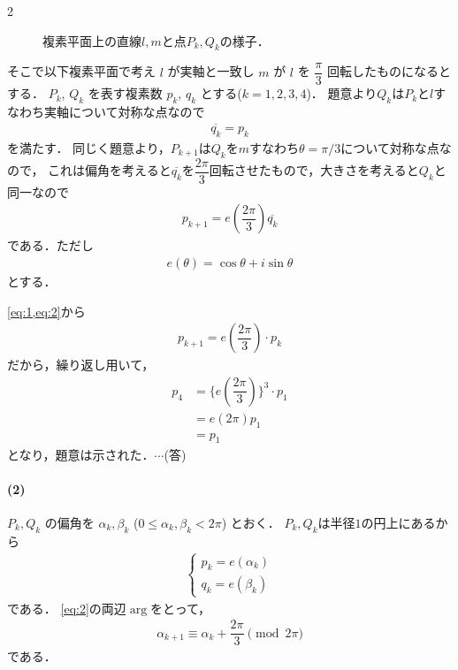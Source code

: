 \documentclass[../../main.tex]{subfiles}
\begin{document}
\begin{multicols}{2}
\begin{figure}[H]
    \caption{複素平面上の直線$l,m$と点$P_k,Q_k$の様子．}
    \label{1996-3:fig:1}
  \end{figure}

  そこで以下複素平面で考え $l$ が実軸と一致し $m$ が $l$ を $\dfrac{\pi}{3}$ 回転したものになるとする．
  $P_k$, $Q_k$ を表す複素数 $p_k$, $q_k$ とする($k=1,2,3,4$)．
  題意より$Q_k$は$P_k$と$l$すなわち実軸について対称な点なので
  \begin{align}
    \overline{q_k} = p_k \label{eq:1}
  \end{align}
  を満たす．
  同じく題意より，$P_{k+1}$は$Q_k$を$m$すなわち$\theta=\pi/3$について対称な点なので，
  これは偏角を考えると$\overline{q_k}$を$\dfrac{2\pi}{3}$回転させたもので，大きさを考えると$Q_k$と同一なので
  \begin{align}
    p_{k+1} = e\left(\dfrac{2\pi}{3}\right) \overline{q_k} \label{eq:2}
  \end{align}
  である．ただし
  \begin{align}
    e(\theta) = \cos \theta + i \sin \theta
  \end{align}
  とする．

  \cref{eq:1,eq:2}から
  \begin{align}
    p_{k+1} = e\left(\dfrac{2\pi}{3}\right) \cdot p_k
  \end{align}
  だから，繰り返し用いて，
  \begin{align}
    p_4
    & = \{e(\dfrac{2\pi}{3})\}^3 \cdot p_1 \\
    & = e(2\pi) p_1                       \\
    & = p_1
  \end{align}
  となり，題意は示された．$\cdots$(答)

  \paragraph{(2)}
  $P_k, Q_k$ の偏角を $\alpha_k, \beta_k$ ($0 \le \alpha_k, \beta_k < 2\pi$) とおく．
  $P_k, Q_k$は半径$1$の円上にあるから
  \begin{align}
    \begin{cases}
      p_k = e(\alpha_k) \\
      q_k = e(\beta_k)
    \end{cases}
  \end{align}
  である．
  \cref{eq:2}の両辺$\arg$をとって，
  \begin{align}
    \alpha_{k+1} \equiv \alpha_k + \dfrac{2\pi}{3} \pmod{2\pi} \label{eq:3}
  \end{align}
  である．


\end{multicols}
\end{document}
